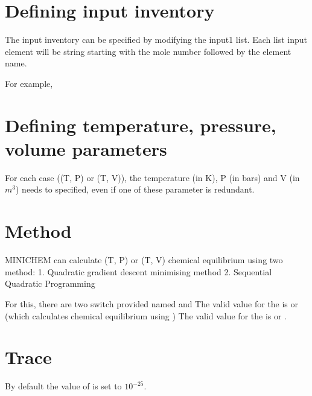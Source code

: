 \documentclass[letterpaper,10pt,english]{sphinxmanual}
\begin{document}
\section{Defining input inventory}
\label{\detokenize{running:defining-input-inventory}}
The input inventory can be specified by modifying the input1 list. Each list input element will be string starting with the mole number followed by the element name.

For example,

\begin{sphinxVerbatim}[commandchars=\\\{\},numbers=left,firstnumber=1,stepnumber=1]
  \PYG{p}{[}  \PYG{p}{]}
\end{sphinxVerbatim}


\section{Defining temperature, pressure, volume parameters}
\label{\detokenize{running:defining-temperature-pressure-volume-parameters}}
For each case ((T, P) or (T, V)), the temperature (in K), P (in bars) and V (in \(m^3\)) needs to specified, even if one of these parameter is redundant.


\section{Method}
\label{\detokenize{running:method}}
MINICHEM can calculate (T, P) or (T, V) chemical equilibrium using two method:
1. Quadratic gradient descent minimising method
2. Sequential Quadratic Programming

For this, there are two switch provided named  and 
\sphinxhyphen{} The valid value for the  is  or  (which calculates chemical equilibrium using )
\sphinxhyphen{} The valid value for the  is  or .


\section{Trace}
\label{\detokenize{running:trace}}
By default the value of  is set to \(10^{-25}\).
\end{document}
